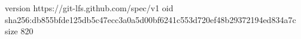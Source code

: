version https://git-lfs.github.com/spec/v1
oid sha256:db855bfde125db5c47ecc3a0a5d00bf6241c553d720ef48b29372194ed834a7c
size 820
